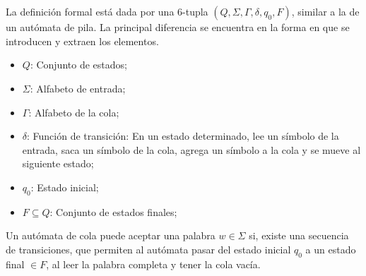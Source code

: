 \documentclass[spanish]{article}
\begin{document}
\\\\
La definición formal está dada por una 6-tupla $(Q, \Sigma, \Gamma, \delta, q_0, F)$, similar a la de un autómata de pila. La principal diferencia se encuentra en la forma en que se introducen y extraen los elementos.
\begin{itemize}
\item $Q$: Conjunto de estados;
\item $\Sigma$: Alfabeto de entrada;
\item $\Gamma$: Alfabeto de la cola;
\item $\delta$: Función de transición: En un estado determinado, lee un símbolo de la entrada, saca un símbolo de la cola, agrega un símbolo a la cola y se mueve al siguiente estado;
\item $q_0$: Estado inicial;
\item $F \subseteq Q$: Conjunto de estados finales;
\end{itemize}
Un autómata de cola puede aceptar una palabra $w \in \Sigma$ si, existe una secuencia de transiciones, que permiten al autómata pasar del estado inicial $q_0$ a un estado final $\in F$, al leer la palabra completa y tener la cola vacía.
\newpage
\end{document}
